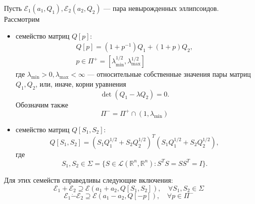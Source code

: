 \begin{theorem}\label{ellips_theorem}
    Пусть \( \mathcal{E}_1(a_1, Q_1), \mathcal{E}_2(a_2, Q_2) \) --- пара невырожденных эллипсоидов. Рассмотрим
    \begin{itemize}
        \item семейство матриц \( Q[p] \):
        \begin{equation*}
            \begin{gathered}
                Q[p] = (1 + p^{-1})Q_1 + (1 + p) Q_2,\\
                p \in \Pi^+ = \left[ \lambda_{\mathrm{min}}^{1/2}, \lambda_{\mathrm{max}}^{1/2} 
                 \right]
            \end{gathered}
        \end{equation*}
        где \( \lambda_{\mathrm{min}} > 0, \lambda_{\mathrm{max}} < \infty \) --- относительные
         собственные
        значения пары матриц \( Q_1, Q_2 \), или, иначе, корни уравнения
        \begin{equation*}
            \det (Q_1 - \lambda Q_2) = 0.
        \end{equation*}
        Обозначим также
        \begin{equation*}
            \Pi^- = \Pi^+ \cap(1, \lambda_{\mathrm{min}})
        \end{equation*}
        \item семейство матриц \( Q[S_1,S_2] \):
        \begin{equation*}
            Q[S_1, S_2] = (S_1 Q_1^{1/2} + S_2 Q_2^{1/2})^T (S_1 Q_1^{1/2} + S_2 Q_2^{1/2}),
        \end{equation*}
        где
        \begin{equation*}
            S_1, S_2 \in \Sigma = \{ S \in \mathcal{L}(\mathbb{R}^n, \mathbb{R}^n): S^T S = S S^T = I \}.
        \end{equation*}
    \end{itemize}
    Для этих семейств справедливы следующие включения:
    \begin{equation*}
        \mathcal{E}_1 + \mathcal{E}_2 \supseteq \mathcal{E}(a_1 + a_2, Q[S_1, S_2]), \quad \forall S_1, S_2 \in \Sigma
    \end{equation*}
    \begin{equation*}
        \mathcal{E}_1 \dot{-} \mathcal{E}_2 \supseteq \mathcal{E}(a_1 - a_2, Q[-p]), \quad \forall p \in \Pi^-
    \end{equation*}
\end{theorem}

